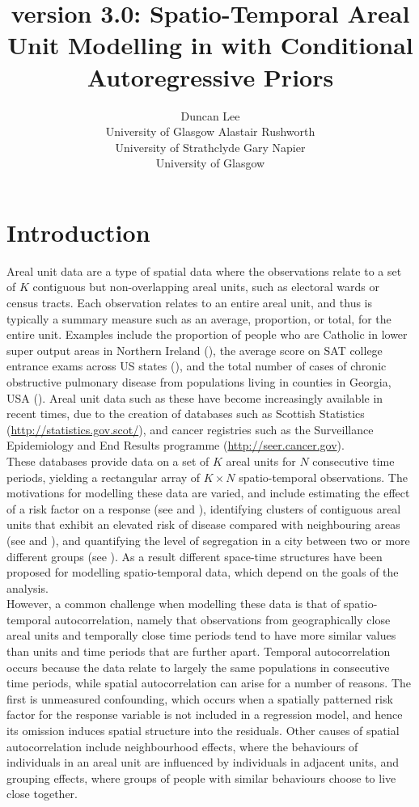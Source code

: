 \documentclass[article, nojss]{jss}
\author{Duncan Lee\\University of Glasgow \And Alastair Rushworth\\University of Strathclyde \And Gary Napier\\University of Glasgow}
\title{\pkg{CARBayesST} version 3.0: Spatio-Temporal Areal Unit Modelling in \proglang{R} with Conditional Autoregressive Priors}
\begin{document}





\section{Introduction}
Areal unit data are a type of spatial data where the observations relate to a set of $K$ contiguous but non-overlapping areal units, such as electoral wards or census tracts. Each observation relates to an entire areal unit, and thus is typically a summary measure such as an average, proportion, or total, for the entire unit. Examples include the proportion of people who are Catholic in lower super output areas in Northern Ireland (\citealp{lee2015}), the average score on SAT college entrance exams across US states (\citealp{wall2004}), and the total number of cases of chronic obstructive pulmonary disease from populations living in counties in Georgia, USA (\citealp{choiENV11}). Areal unit data such as these have become increasingly available in recent times, due to the creation of databases such as Scottish Statistics (\url{http://statistics.gov.scot/}), and cancer registries such as the Surveillance Epidemiology and End Results programme (\url{http://seer.cancer.gov}).\\

 These databases provide data on a set of $K$ areal units for $N$ consecutive time periods, yielding a rectangular array of $K\times N$ spatio-temporal observations. The motivations for modelling these data are varied, and include estimating the effect of a risk factor on a response (see \citealp{wakefield2007} and \citealp{lee2009}), identifying clusters of contiguous areal units that exhibit an elevated risk of disease compared with neighbouring areas (see \citealp{charras2012} and \citealp{anderson2014}), and quantifying the level of segregation in a city between two or more different groups (see \citealp{lee2015}). As a result different space-time structures have been proposed for modelling spatio-temporal data, which depend on the goals of the analysis.\\
 

However, a common challenge when modelling these data is that of spatio-temporal autocorrelation, namely that observations from geographically close areal units and temporally close time periods tend to have more similar values than units and time periods that are further apart. Temporal autocorrelation occurs because the data relate to largely the same populations in consecutive time periods, while spatial autocorrelation can arise for a number of reasons. The first is unmeasured confounding, which occurs when a spatially patterned risk factor for the response variable is not included in a regression  model, and hence its omission induces spatial structure into the residuals. Other causes of spatial autocorrelation include neighbourhood effects, where the behaviours of individuals in an areal unit  are influenced by individuals in adjacent units, and grouping effects, where groups of people with similar behaviours choose to live close together.\\
\end{document}
